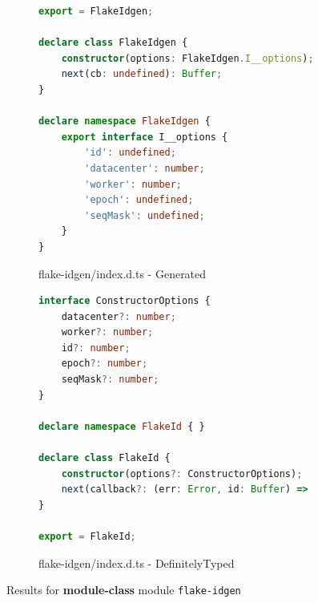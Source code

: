 \documentclass[a4paper,english,cleveref, autoref]{lipics-v2019}
\begin{document}
\begin{figure}[tp]
    \centering
    \begin{subfigure}{0.48\linewidth}
      \begin{lstlisting}[language=TypeScript]
export = FlakeIdgen;

declare class FlakeIdgen {
    constructor(options: FlakeIdgen.I__options);
    next(cb: undefined): Buffer;
}

declare namespace FlakeIdgen {
    export interface I__options {
        'id': undefined;
        'datacenter': number;
        'worker': number;
        'epoch': undefined;
        'seqMask': undefined;
    }
}
      \end{lstlisting}
      \caption{flake-idgen/index.d.ts - Generated}
    \end{subfigure}
    \hfill
    \begin{subfigure}{0.48\linewidth}
      \begin{lstlisting}[language=TypeScript]
interface ConstructorOptions {
    datacenter?: number;
    worker?: number;
    id?: number;
    epoch?: number;
    seqMask?: number;
}

declare namespace FlakeId { }

declare class FlakeId {
    constructor(options?: ConstructorOptions);
    next(callback?: (err: Error, id: Buffer) => void): Buffer;
}

export = FlakeId;        
      \end{lstlisting}
      \caption{flake-idgen/index.d.ts - DefinitelyTyped}
    \end{subfigure}

    \caption{Results for \textbf{module-class} module \texttt{flake-idgen}}
    \label{fig:experiments-results-module-class-flake-idgen}
\end{figure}
\end{document}
